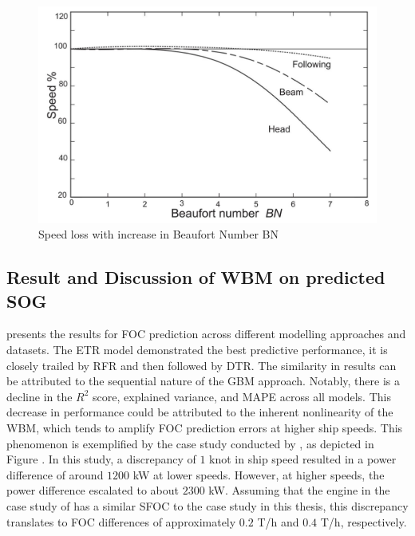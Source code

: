 \begin{figure}[ht]
    \centering
    \includegraphics[width=.7\linewidth]{02_figures/molland17_speedlosscurve.jpg}
    \caption{Speed loss with increase in Beaufort Number BN }
    \label{fig:molland17_speedloss_windwave}
\end{figure}

\subsection{Result and Discussion of WBM on predicted SOG}\label{sec:WBM_result_discussion}

 presents the results for FOC prediction across different modelling approaches and datasets. The ETR model demonstrated the best predictive performance, it is closely trailed by RFR and then followed by DTR. The similarity in results can be attributed to the sequential nature of the GBM approach. Notably, there is a decline in the $R^2$ score, explained variance, and MAPE across all models. This decrease in performance could be attributed to the inherent nonlinearity of the WBM, which tends to amplify FOC prediction errors at higher ship speeds. This phenomenon is exemplified by the case study conducted by , as depicted in Figure . In this study, a discrepancy of $1$ knot in ship speed resulted in a power difference of around $1200$ kW at lower speeds. However, at higher speeds, the power difference escalated to about $2300$ kW. Assuming that the engine in the case study of  has a similar SFOC to the case study in this thesis, this discrepancy translates to FOC differences of approximately $0.2$ T/h and $0.4$ T/h, respectively.


